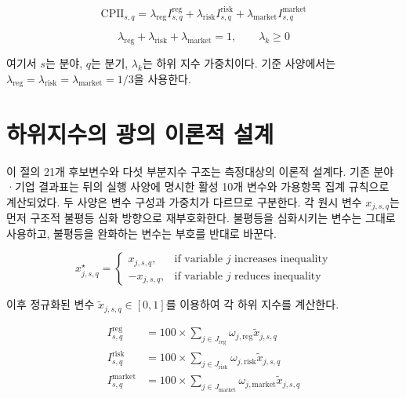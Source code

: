 \documentclass[11pt,a4paper]{report}
\begin{document}
\begin{equation}
\label{eq:cpii_total}
\mathrm{CPII}_{s,q} = \lambda_{\mathrm{reg}} I^{\mathrm{reg}}_{s,q} + \lambda_{\mathrm{risk}} I^{\mathrm{risk}}_{s,q} + \lambda_{\mathrm{market}} I^{\mathrm{market}}_{s,q}
\end{equation}

\begin{equation}
\label{eq:cpii_weight_constraint}
\lambda_{\mathrm{reg}} + \lambda_{\mathrm{risk}} + \lambda_{\mathrm{market}} = 1, \qquad \lambda_k \ge 0
\end{equation}

여기서 $s$는 분야, $q$는 분기, $\lambda_k$는 하위 지수 가중치이다. 기준 사양에서는 $\lambda_{\mathrm{reg}}=\lambda_{\mathrm{risk}}=\lambda_{\mathrm{market}}=1/3$을 사용한다.

\section{하위지수의 광의 이론적 설계}
이 절의 21개 후보변수와 다섯 부분지수 구조는 측정대상의 이론적 설계다. 기존 분야·기업 결과표는 뒤의 실행 사양에 명시한 활성 10개 변수와 가용항목 집계 규칙으로 계산되었다. 두 사양은 변수 구성과 가중치가 다르므로 구분한다.
각 원시 변수 $x_{j,s,q}$는 먼저 구조적 불평등 심화 방향으로 재부호화한다. 불평등을 심화시키는 변수는 그대로 사용하고, 불평등을 완화하는 변수는 부호를 반대로 바꾼다.

\begin{equation}
\label{eq:cpii_directional_recode}
x^{\star}_{j,s,q} =
\begin{cases}
x_{j,s,q}, & \text{if variable } j \text{ increases inequality} \\
-x_{j,s,q}, & \text{if variable } j \text{ reduces inequality}
\end{cases}
\end{equation}

이후 정규화된 변수 $\widetilde{x}_{j,s,q}\in[0,1]$를 이용하여 각 하위 지수를 계산한다.

\begin{align}
I^{\mathrm{reg}}_{s,q} &= 100 \times \sum_{j \in J_{\mathrm{reg}}} \omega_{j,\mathrm{reg}} \widetilde{x}_{j,s,q} \\
I^{\mathrm{risk}}_{s,q} &= 100 \times \sum_{j \in J_{\mathrm{risk}}} \omega_{j,\mathrm{risk}} \widetilde{x}_{j,s,q} \\
I^{\mathrm{market}}_{s,q} &= 100 \times \sum_{j \in J_{\mathrm{market}}} \omega_{j,\mathrm{market}} \widetilde{x}_{j,s,q} \label{eq:cpii_subindex_generic}
\end{align}
\end{document}
